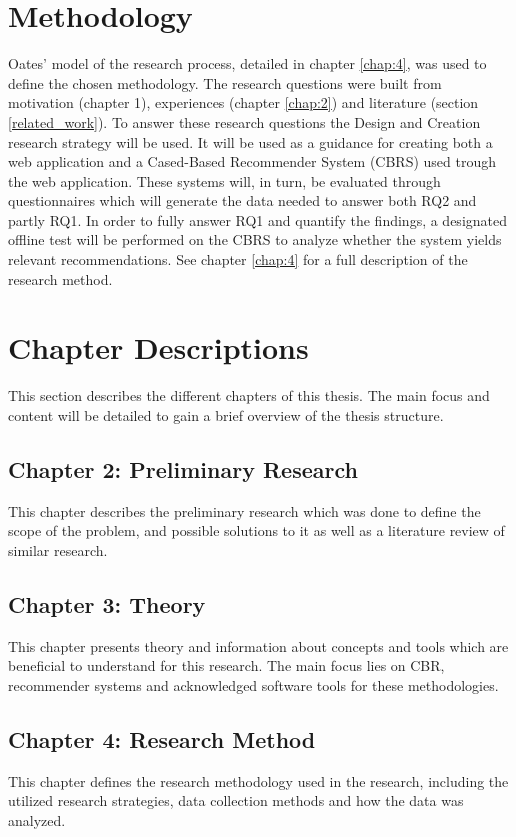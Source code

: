 \section{Methodology}
Oates'\cite{oates2005researching} model of the research process, detailed in chapter \ref{chap:4}, was used to define the chosen methodology. The research questions were built from motivation (chapter 1), experiences (chapter \ref{chap:2}) and literature (section \ref{related_work}).
To answer these research questions the Design and Creation research strategy will be used. It will be used as a guidance for creating both a web application and a Cased-Based Recommender System (CBRS) used trough the web application. These systems will, in turn, be evaluated through questionnaires which will generate the data needed to answer both RQ2 and partly RQ1. In order to fully answer RQ1 and quantify the findings, a designated offline test will be performed on the CBRS to analyze whether the system yields relevant recommendations. See chapter \ref{chap:4} for a full description of the research method.


\section{Chapter Descriptions}
This section describes the different chapters of this thesis. The main focus and content will be detailed to gain a brief overview of the thesis structure.

\subsection*{Chapter 2: Preliminary Research}
This chapter describes the preliminary research which was done to define the scope of the problem, and possible solutions to it as well as a literature review of similar research.

\subsection*{Chapter 3: Theory}
This chapter presents theory and information about concepts and tools which are beneficial to understand for this research. The main focus lies on CBR, recommender systems and acknowledged software tools for these methodologies. 

\subsection*{Chapter 4: Research Method}
This chapter defines the research methodology used in the research, including the utilized research strategies, data collection methods and how the data was analyzed. 


